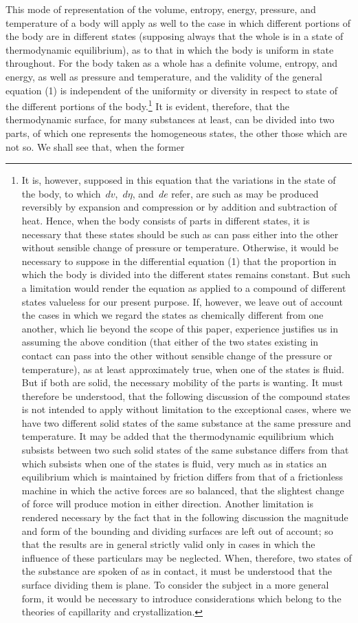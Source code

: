 \documentclass[11pt]{article}
\newcommand{\dd}{\,d}
\begin{document}
This mode of representation of the volume, entropy, energy, pressure, and temperature of a body will apply as well to the case in which different portions of the body are in different states (supposing always that the whole is in a state of thermodynamic equilibrium), as to that in which the body is uniform in state throughout. For the body taken as a whole has a definite volume, entropy, and energy, as well as pressure and temperature, and the validity of the general equation (1) is independent of the uniformity or diversity in respect to state of the different portions of the body.\footnote{It is, however, supposed in this equation that the variations in the state of the body, to which $\dd v$, $\dd\eta$, and $\dd e$ refer, are such as may be produced reversibly by expansion and compression or by addition and subtraction of heat. Hence, when the body consists of parts in different states, it is necessary that these states should be such as can pass either into the other without sensible change of pressure or temperature. Otherwise, it would be necessary to suppose in the differential equation (1) that the proportion in which the body is divided into the different states remains constant. But such a limitation would render the equation as applied to a compound of different states valueless for our present purpose. If, however, we leave out of account the cases in which we regard the states as chemically different from one another, which lie beyond the scope of this paper, experience justifies us in assuming the above condition (that either of the two states existing in contact can pass into the other without sensible change of the pressure or temperature), as at least approximately true, when one of the states is fluid. But if both are solid, the necessary mobility of the parts is wanting. It must therefore be understood, that the following discussion of the compound states is not intended to apply without limitation to the exceptional cases, where we have two different solid states of the same substance at the same pressure and temperature. It may be added that the thermodynamic equilibrium which subsists between two such solid states of the same substance differs from that which subsists when one of the states is fluid, very much as in statics an equilibrium which is maintained by friction differs from that of a frictionless machine in which the active forces are so balanced, that the slightest change of force will produce motion in either direction. Another limitation is rendered necessary by the fact that in the following discussion the magnitude and form of the bounding and dividing surfaces are left out of account; so that the results are in general strictly valid only in cases in which the influence of these particulars may be neglected. When, therefore, two states of the substance are spoken of as in contact, it must be understood that the surface dividing them is plane. To consider the subject in a more general form, it would be necessary to introduce considerations which belong to the theories of capillarity and crystallization.} It is evident, therefore, that the thermodynamic surface, for many substances at least, can be divided into two parts, of which one represents the homogeneous states, the other those which are not so. We shall see that, when the former 
\end{document}
